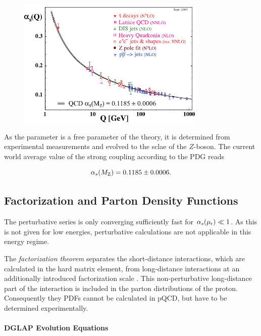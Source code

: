 \begin{figure}[htb] 
    \centering
    \includegraphics[width=0.8\textwidth]{figures/sm_model/as_running.pdf}\hfill
    \caption[Running of the strong coupling]{} 
    \label{fig:fundamental_couplings} 
\end{figure}


As the parameter is a free parameter of the theory, it is determined from
experimental measurements and evolved to the sclae of the $Z$-boson. The current
world average value of the strong coupling according to the PDG reads

\begin{equation*}
    \alpha_{s}(M_\mathrm{Z}) = 0.1185 \pm 0.0006.
\end{equation*}

\subsection{Factorization and Parton Density Functions}

The perturbative series is only converging sufficiently fast for $\alpha_{s}(\mu_{\mathrm{r}}) \ll
1$. As this is not given for low energies, perturbative calculations are not
applicable in this energy regime. 


The \emph{factorization theorem} separates the short-distance interactions,
which are calculated in the hard matrix element, from long-distance interactions
at an additionally introduced factorization scale \muf. This non-perturbative
long-distance part of the interaction is included in the parton distributions of
the proton. Consequently they PDFs cannot be calculated in pQCD, but have to be
determined experimentally.

\paragraph{DGLAP Evolution Equations}

